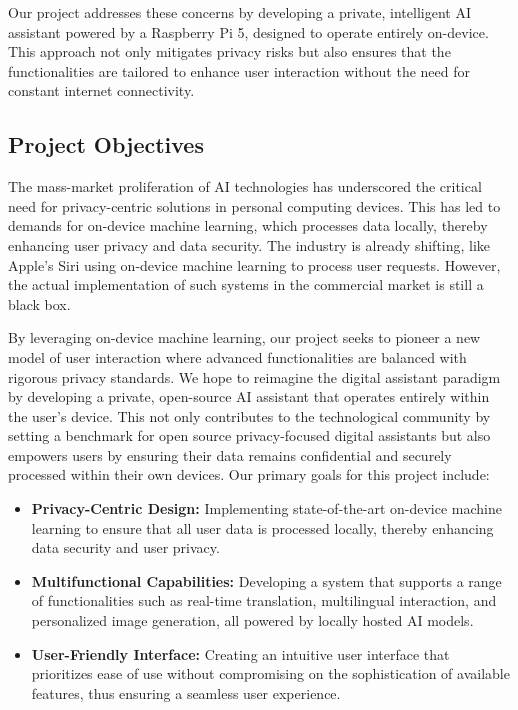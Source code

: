 \documentclass[12pt]{article}
\begin{document}
Our project addresses these concerns by developing a private, intelligent AI assistant powered by a Raspberry Pi 5, designed to operate entirely on-device. This approach not only mitigates privacy risks but also ensures that the functionalities are tailored to enhance user interaction without the need for constant internet connectivity.

\subsection{Project Objectives}
The mass-market proliferation of AI technologies has underscored the critical need for privacy-centric solutions in personal computing devices. This has led to demands for on-device machine learning, which processes data locally, thereby enhancing user privacy and data security. The industry is already shifting, like Apple's Siri using on-device machine learning to process user requests. However, the actual implementation of such systems in the commercial market is still a black box. 

By leveraging on-device machine learning, our project seeks to pioneer a new model of user interaction where advanced functionalities are balanced with rigorous privacy standards. We hope to reimagine the digital assistant paradigm by developing a private, open-source AI assistant that operates entirely within the user's device.
This not only contributes to the technological community by setting a benchmark for open source privacy-focused digital assistants but also empowers users by ensuring their data remains confidential and securely processed within their own devices.
Our primary goals for this project include:
\begin{itemize}
    \item \textbf{Privacy-Centric Design:} Implementing state-of-the-art on-device machine learning to ensure that all user data is processed locally, thereby enhancing data security and user privacy.
    \item \textbf{Multifunctional Capabilities:} Developing a system that supports a range of functionalities such as real-time translation, multilingual interaction, and personalized image generation, all powered by locally hosted AI models.
    \item \textbf{User-Friendly Interface:} Creating an intuitive user interface that prioritizes ease of use without compromising on the sophistication of available features, thus ensuring a seamless user experience.
\end{itemize}
\end{document}

